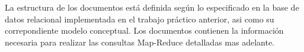 La estructura de los documentos está definida según lo especificado en la base de datos relacional implementada en el trabajo práctico anterior,
asi como su correpondiente modelo conceptual. Los documentos contienen la información necesaria para realizar las consultas Map-Reduce
detalladas mas adelante.